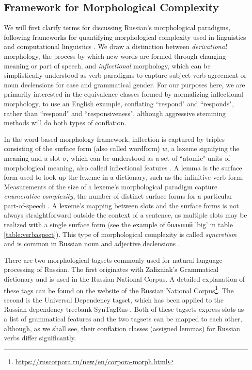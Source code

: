 \documentclass[11pt,a4paper]{article}
\begin{document}
\subsection{Framework for Morphological Complexity}
We will first clarify terms for discussing Russian's morphological paradigms, following frameworks for quantifying morphological complexity used in linguistics and computational linguistics \cite{baerman2015intro, cotterell-etal-2019-complexity}. We draw a distinction between \textit{derivational} morphology, the process by which new words are formed through changing meaning or part of speech, and \textit{inflectional} morphology, which can be simplistically understood as verb paradigms to capture subject-verb agreement or noun declensions for case and grammatical gender. For our purposes here, we are primarily interested in the equivalence classes formed by normalizing inflectional morphology, to use an English example, conflating ``respond" and ``responds", rather than ``respond" and ``responsiveness", although aggressive stemming methods will do both types of conflation.

In the word-based morphology framework, inflection is captured by triples consisting of the surface form (also called wordform) $w$, a lexeme  signifying the meaning and a slot $\sigma$, which can be understood as a set of ``atomic" units of morphological meaning, also called inflectional features \cite{aronoff1976word,sylak-glassman-etal-2015-language,cotterell-etal-2019-complexity}.
A lemma is the surface form used to look up the lexeme in a dictionary, such as the infinitive verb form. Measurements of the size of a lexeme's morphological paradigm capture \textit{enumerative complexity}, the number of distinct surface forms for a particular part-of-speech \cite{cotterell-etal-2019-complexity}. A lexeme's mapping between slots and the surface forms is not always straightforward outside the context of a sentence, as multiple slots may be realized with a single surface form (see the example of \foreignlanguage{russian}{большой} 'big' in table \ref{table:verbaspect}). This type of morphological complexity is called \textit{syncretism} and is common in Russian noun and adjective declensions \cite{baerman2015understanding,Milizia2015PatternsOS}.

There are two morphological tagsets commonly used for natural language processing of Russian. The first originates with Zalizniak's Grammatical dictionary and is used in the Russian National Corpus. A detailed explanation of these tags can be found on the website of the Russian National Corpus\footnote{\url{https://ruscorpora.ru/new/en/corpora-morph.html}}. The second is the Universal Dependency tagset, which has been applied to the Russian dependency treebank SynTagRus \cite{Sharoff2011ThePP,lipenkova-soucek-2014-converting,mcdonald-etal-2013-universal}. Both of these tagsets express slots as a list of grammatical features and the two tagsets can be mapped to each other, although, as we shall see, their conflation classes (assigned lemmas) for Russian verbs differ significantly.
\end{document}
